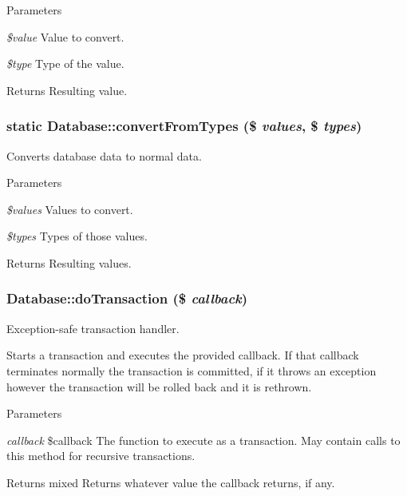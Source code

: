 \begin{DoxyParams}{Parameters}
\item[{\em \$value}]Value to convert. \item[{\em \$type}]Type of the value.\end{DoxyParams}
\begin{DoxyReturn}{Returns}
Resulting value. 
\end{DoxyReturn}
\hypertarget{classDatabase_a2c45ff0539c569218940280fb4b6239d}{
\subsubsection[{convertFromTypes}]{\setlength{\rightskip}{0pt plus 5cm}static Database::convertFromTypes (\$ {\em values}, \/  \$ {\em types})}}
\label{classDatabase_a2c45ff0539c569218940280fb4b6239d}
Converts database data to normal data.


\begin{DoxyParams}{Parameters}
\item[{\em \$values}]Values to convert. \item[{\em \$types}]Types of those values.\end{DoxyParams}
\begin{DoxyReturn}{Returns}
Resulting values. 
\end{DoxyReturn}
\hypertarget{classDatabase_a3ac67d2c28767d5c6d66db12d3568d7c}{
\subsubsection[{doTransaction}]{\setlength{\rightskip}{0pt plus 5cm}Database::doTransaction (\$ {\em callback})}}
\label{classDatabase_a3ac67d2c28767d5c6d66db12d3568d7c}
Exception-\/safe transaction handler.

Starts a transaction and executes the provided callback. If that callback terminates normally the transaction is committed, if it throws an exception however the transaction will be rolled back and it is rethrown.


\begin{DoxyParams}{Parameters}
\item[{\em callback}]\$callback The function to execute as a transaction. May contain calls to this method for recursive transactions.\end{DoxyParams}
\begin{DoxyReturn}{Returns}
mixed Returns whatever value the callback returns, if any.
\end{DoxyReturn}

